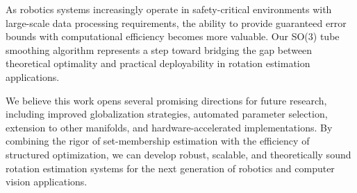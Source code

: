 As robotics systems increasingly operate in safety-critical environments with large-scale data processing requirements, the ability to provide guaranteed error bounds with computational efficiency becomes more valuable. Our SO(3) tube smoothing algorithm represents a step toward bridging the gap between theoretical optimality and practical deployability in rotation estimation applications.

We believe this work opens several promising directions for future research, including improved globalization strategies, automated parameter selection, extension to other manifolds, and hardware-accelerated implementations. By combining the rigor of set-membership estimation with the efficiency of structured optimization, we can develop robust, scalable, and theoretically sound rotation estimation systems for the next generation of robotics and computer vision applications.
